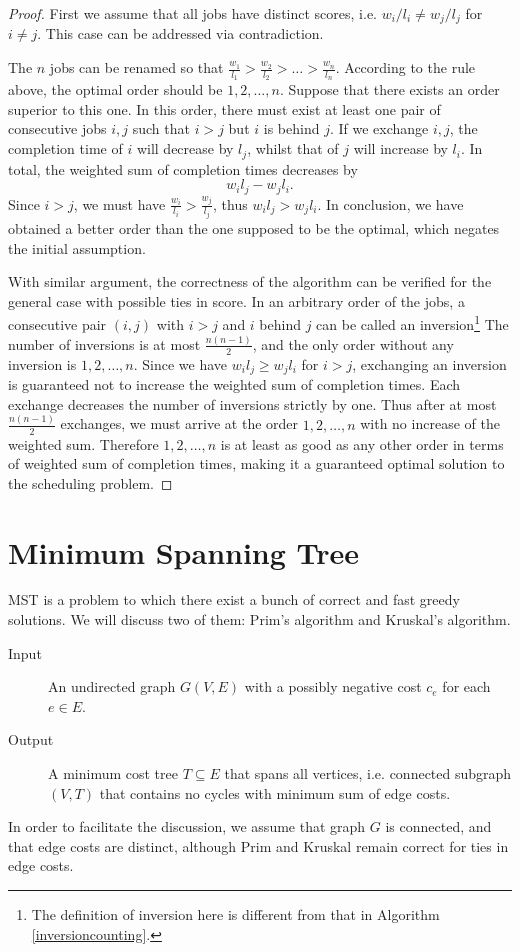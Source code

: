 \begin{proof}
First we assume that all jobs have distinct scores, i.e. $w_i/l_i\neq w_j/l_j$ for $i\neq j$. This case can be addressed via contradiction.

The $n$ jobs can be renamed so that $\frac{w_1}{l_1}>\frac{w_2}{l_2}>\dots>\frac{w_n}{l_n}$. According to the rule above, the optimal order should be $1,2,\dots,n$. Suppose that there exists an order superior to this one. In this order, there must exist at least one pair of consecutive jobs $i,j$ such that $i>j$ but $i$ is behind $j$. If we exchange $i,j$, the completion time of $i$ will decrease by $l_j$, whilst that of $j$ will increase by $l_i$. In total, the weighted sum of completion times decreases by
$$w_il_j-w_jl_i.$$
Since $i>j$, we must have $\frac{w_i}{l_i}>\frac{w_j}{l_j}$, thus $w_il_j>w_jl_i$. In conclusion, we have obtained a better order than the one supposed to be the optimal, which negates the initial assumption.

With similar argument, the correctness of the algorithm can be verified for the general case with possible ties in score. In an arbitrary order of the jobs, a consecutive pair $(i,j)$ with $i>j$ and $i$ behind $j$ can be called an inversion\footnote{The definition of inversion here is different from that in Algorithm \ref{inversioncounting}.} The number of inversions is at most $\frac{n(n-1)}{2}$, and the only order without any inversion is $1,2,\dots,n$. Since we have $w_il_j\geq w_jl_i$ for $i>j$, exchanging an inversion is guaranteed not to increase the weighted sum of completion times. Each exchange decreases the number of inversions strictly by one. Thus after at most $\frac{n(n-1)}{2}$ exchanges, we must arrive at the order $1,2,\dots,n$ with no increase of the weighted sum. Therefore $1,2,\dots,n$ is at least as good as any other order in terms of weighted sum of completion times, making it a guaranteed optimal solution to the scheduling problem.
\end{proof}
\section{Minimum Spanning Tree}
MST is a problem to which there exist a bunch of correct and fast greedy solutions. We will discuss two of them: Prim's algorithm and Kruskal's algorithm.
\begin{description}
\item[Input]An undirected graph $G(V,E)$ with a possibly negative cost $c_e$ for each $e\in E$. 
\item[Output]A minimum cost tree $T\subseteq E$ that spans all vertices, i.e. connected subgraph $(V,T)$ that contains no cycles with minimum sum of edge costs.
\end{description}
In order to facilitate the discussion, we assume that graph $G$ is connected, and that edge costs are distinct, although Prim and Kruskal remain correct for ties in edge costs.
